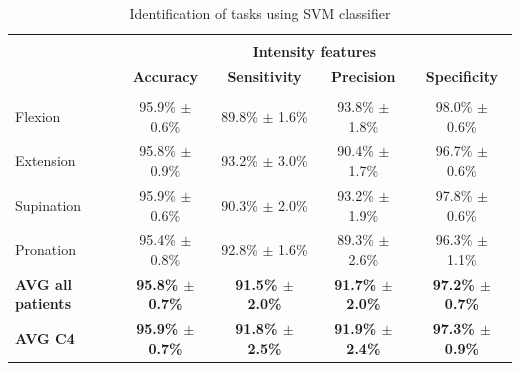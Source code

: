 \begin{table}[]
\centering
\caption{Identification of tasks using SVM classifier}
\label{tb:2-4}
\begin{tabular}{lcccc}
                    &                                 &                               &                                    &                                       \\
                          & \multicolumn{4}{c}{\large{\textbf{Intensity features}}}                                                                                                                                                       \\
                          & \textbf{Accuracy}                               & \textbf{Sensitivity}                            & \textbf{Precision}                              & \textbf{Specificity}                            \\ \hline
                    &                                 &                               &                                    &                                       \\
Flexion                   & \multicolumn{1}{c}{95.9\% $\pm$ 0.6\%}          & \multicolumn{1}{c}{89.8\% $\pm$ 1.6\%}          & \multicolumn{1}{c}{93.8\% $\pm$ 1.8\%}          & \multicolumn{1}{c}{98.0\% $\pm$ 0.6\%}          \\
Extension                 & \multicolumn{1}{c}{95.8\% $\pm$ 0.9\%}          & \multicolumn{1}{c}{93.2\% $\pm$ 3.0\%}          & \multicolumn{1}{c}{90.4\% $\pm$ 1.7\%}          & \multicolumn{1}{c}{96.7\% $\pm$ 0.6\%}          \\
Supination                & \multicolumn{1}{c}{95.9\% $\pm$ 0.6\%}          & \multicolumn{1}{c}{90.3\% $\pm$ 2.0\%}          & \multicolumn{1}{c}{93.2\% $\pm$ 1.9\%}          & \multicolumn{1}{c}{97.8\% $\pm$ 0.6\%}          \\
Pronation                 & \multicolumn{1}{c}{95.4\% $\pm$ 0.8\%}          & \multicolumn{1}{c}{92.8\% $\pm$ 1.6\%}          & \multicolumn{1}{c}{89.3\% $\pm$ 2.6\%}          & \multicolumn{1}{c}{96.3\% $\pm$ 1.1\%}          \\ \hline \hline
\textbf{AVG all patients} & \multicolumn{1}{c}{\textbf{95.8\% $\pm$ 0.7\%}} & \multicolumn{1}{c}{\textbf{91.5\% $\pm$ 2.0\%}} & \multicolumn{1}{c}{\textbf{91.7\% $\pm$ 2.0\%}} & \multicolumn{1}{c}{\textbf{97.2\% $\pm$ 0.7\%}} \\
\textbf{AVG C4}           & \multicolumn{1}{c}{\textbf{95.9\% $\pm$ 0.7\%}} & \multicolumn{1}{c}{\textbf{91.8\% $\pm$ 2.5\%}} & \multicolumn{1}{c}{\textbf{91.9\% $\pm$ 2.4\%}} & \multicolumn{1}{c}{\textbf{97.3\% $\pm$ 0.9\%}} \\

\end{tabular}
\end{table}
